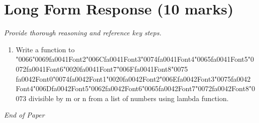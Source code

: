 \documentclass[12pt]{article}
\begin{document}
\section*{Long Form Response (10 marks)}
\textit{Provide thorough reasoning and reference key steps.}
\begin{enumerate}[label=\arabic*.]
\item Write a function to {\char"0066}{\char"0069}{\csname fa0041Font2\endcsname\char"006C}{\csname fa0041Font3\endcsname\char"0074}{\csname fa0041Font4\endcsname\char"0065}{\csname fa0041Font5\endcsname\char"0072}{\csname fa0041Font6\endcsname\char"0020}{\csname fa0041Font7\endcsname\char"006F}{\csname fa0041Font8\endcsname\char"0075} {\csname fa0042Font0\endcsname\char"0074}{\csname fa0042Font1\endcsname\char"0020}{\csname fa0042Font2\endcsname\char"006E}{\csname fa0042Font3\endcsname\char"0075}{\csname fa0042Font4\endcsname\char"006D}{\csname fa0042Font5\endcsname\char"0062}{\csname fa0042Font6\endcsname\char"0065}{\csname fa0042Font7\endcsname\char"0072}{\csname fa0042Font8\endcsname\char"0073} divisible by m or n from a list of numbers using lambda
function.
\end{enumerate}

\vfill
\noindent\textit{End of Paper}
\end{document}

